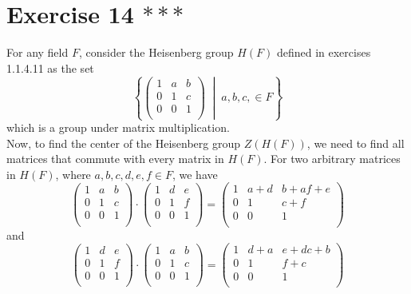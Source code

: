\documentclass[12pt]{article}
\begin{document}
    \section*{Exercise 14 $***$}
    For any field $F$, consider the Heisenberg group $H(F)$
    defined in exercises 1.1.4.11
    as the set
    \[\left\{ \begin{pmatrix}
        1 & a & b \\        
        0 & 1 & c \\
        0 & 0 & 1 \\
    \end{pmatrix} \; \middle\vert \; a, b, c, \in F \right\}\]
    which is a group under matrix multiplication. \\
    Now, to find the center of the Heisenberg group $Z(H(F))$,
    we need to find all matrices that commute with every matrix in $H(F)$.
    For two arbitrary matrices in $H(F)$,
    where $a, b, c, d, e, f \in F$, we have
    \[\begin{pmatrix}
        1 & a & b \\        
        0 & 1 & c \\
        0 & 0 & 1 \\
    \end{pmatrix} \cdot \begin{pmatrix}
        1 & d & e \\        
        0 & 1 & f \\
        0 & 0 & 1 \\
    \end{pmatrix}
    = \begin{pmatrix}
        1 & a + d & b + af + e \\        
        0 & 1 & c + f \\
        0 & 0 & 1 \\
    \end{pmatrix}
    \]
    and
    \[\begin{pmatrix}
        1 & d & e \\        
        0 & 1 & f \\
        0 & 0 & 1 \\
    \end{pmatrix} \cdot \begin{pmatrix}
        1 & a & b \\        
        0 & 1 & c \\
        0 & 0 & 1 \\
    \end{pmatrix}
    = \begin{pmatrix}
        1 & d + a & e + dc + b \\        
        0 & 1 & f + c \\
        0 & 0 & 1 \\
    \end{pmatrix}
    \]
\end{document}

